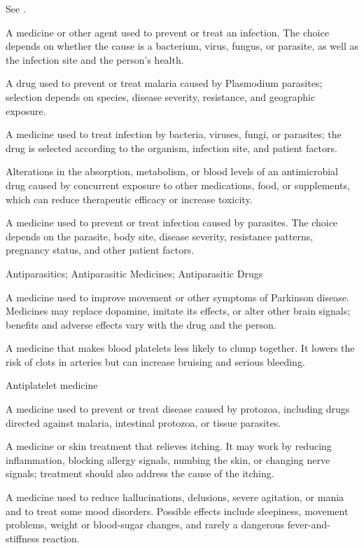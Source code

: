  See .


 A medicine or other agent used to prevent or treat an infection. The choice depends on whether the cause is a bacterium, virus, fungus, or parasite, as well as the infection site and the person’s health.

 A drug used to prevent or treat malaria caused by Plasmodium parasites; selection depends on species, disease severity, resistance, and geographic exposure.

 A medicine used to treat infection by bacteria, viruses, fungi, or parasites; the drug is selected according to the organism, infection site, and patient factors.

 Alterations in the absorption, metabolism, or blood levels of an antimicrobial drug caused by concurrent exposure to other medications, food, or supplements, which can reduce therapeutic efficacy or increase toxicity.

 A medicine used to prevent or treat infection caused by parasites. The choice depends on the parasite, body site, disease severity, resistance patterns, pregnancy status, and other patient factors.

\synonyms
Antiparasitics; Antiparasitic Medicines; Antiparasitic Drugs

 A medicine used to improve movement or other symptoms of Parkinson disease. Medicines may replace dopamine, imitate its effects, or alter other brain signals; benefits and adverse effects vary with the drug and the person.

 A medicine that makes blood platelets less likely to clump together. It lowers the risk of clots in arteries but can increase bruising and serious bleeding.

\synonyms
Antiplatelet medicine

 A medicine used to prevent or treat disease caused by protozoa, including drugs directed against malaria, intestinal protozoa, or tissue parasites.

 A medicine or skin treatment that relieves itching. It may work by reducing inflammation, blocking allergy signals, numbing the skin, or changing nerve signals; treatment should also address the cause of the itching.

 A medicine used to reduce hallucinations, delusions, severe agitation, or mania and to treat some mood disorders. Possible effects include sleepiness, movement problems, weight or blood-sugar changes, and rarely a dangerous fever-and-stiffness reaction.


